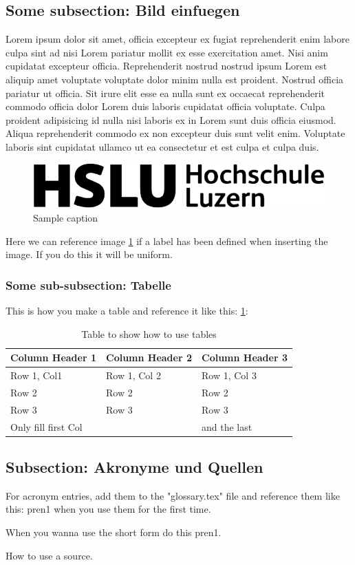 \subsection{Some subsection: Bild einfuegen}
Lorem ipsum dolor sit amet, officia excepteur ex fugiat reprehenderit enim labore culpa sint ad nisi Lorem pariatur mollit ex esse exercitation amet. Nisi anim cupidatat excepteur officia. Reprehenderit nostrud nostrud ipsum Lorem est aliquip amet voluptate voluptate dolor minim nulla est proident. Nostrud officia pariatur ut officia. Sit irure elit esse ea nulla sunt ex occaecat reprehenderit commodo officia dolor Lorem duis laboris cupidatat officia voluptate. Culpa proident adipisicing id nulla nisi laboris ex in Lorem sunt duis officia eiusmod. Aliqua reprehenderit commodo ex non excepteur duis sunt velit enim. Voluptate laboris sint cupidatat ullamco ut ea consectetur et est culpa et culpa duis.

\begin{figure}[h]
\centering
\includegraphics[width=\textwidth]{img/HSLU_Logo.png}
\caption{Sample caption}
\label{fig:hslu-logo}
\end{figure}

Here we can reference image \ref{fig:hslu-logo} if a label has been defined when inserting the image. If you do this it will be uniform.

\subsubsection{Some sub-subsection: Tabelle}

This is how you make a table and reference it like this: \ref{table:template}:

\begin{table}[h!]
\centering
\begin{tabular}{ |l| l| l|} %
  \textbf{Column Header 1} & \textbf{Column Header 2} &  \textbf{Column Header 3}\\
  \hline
  
  Row 1, Col1 & Row 1, Col 2 & Row 1, Col 3\\

  Row 2 &Row 2 & Row 2 \\
  
  Row 3 & Row 3 & Row 3 \\
  
  
  Only fill first Col && and the last\\
\end{tabular}
\caption{Table to show how to use tables}
\label{table:template}
\end{table}

\subsection{Subsection: Akronyme und Quellen}

For acronym entries, add them to the "glossary.tex" file and reference them like this: \acrfull{pren1} when you use them for the first time.

When you wanna use the short form do this \acrshort{pren1}.

How to use a source\cite{wikipedia-scrum}.
